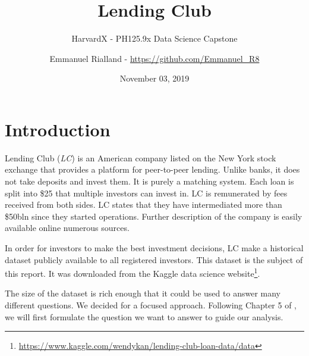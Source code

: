 \documentclass[11pt,]{report}
\title{Lending Club}
\subtitle{HarvardX - PH125.9x Data Science Capstone}
\author{Emmanuel Rialland - \url{https://github.com/Emmanuel_R8}}
\date{November 03, 2019}
\let\rmarkdownfootnote\footnote%
\def\footnote{\protect\rmarkdownfootnote}
\begin{document}
\maketitle

{
\hypersetup{linkcolor=black}
\setcounter{tocdepth}{2}
\tableofcontents
}
\listoftables
\listoffigures
\small

\normalsize

\small

\normalsize

\small

\normalsize

\small

\normalsize

\small

\normalsize

\small

\normalsize

\hypertarget{introduction}{%
\chapter*{Introduction}\label{introduction}}

Lending Club (\emph{LC}) is an American company listed on the New York stock exchange that provides a platform for peer-to-peer lending. Unlike banks, it does not take deposits and invest them. It is purely a matching system. Each loan is split into \$25 that multiple investors can invest in. LC is remunerated by fees received from both sides. LC states that they have intermediated more than \$50bln since they started operations. Further description of the company is easily available online numerous sources.

In order for investors to make the best investment decisions, LC make a historical dataset publicly available to all registered investors. This dataset is the subject of this report. It was downloaded from the Kaggle data science website\footnote{\url{https://www.kaggle.com/wendykan/lending-club-loan-data/data}}.

The size of the dataset is rich enough that it could be used to answer many different questions. We decided for a focused approach. Following Chapter 5 of \citep{peng2012exploratory}, we will first formulate the question we want to answer to guide our analysis.
\end{document}
